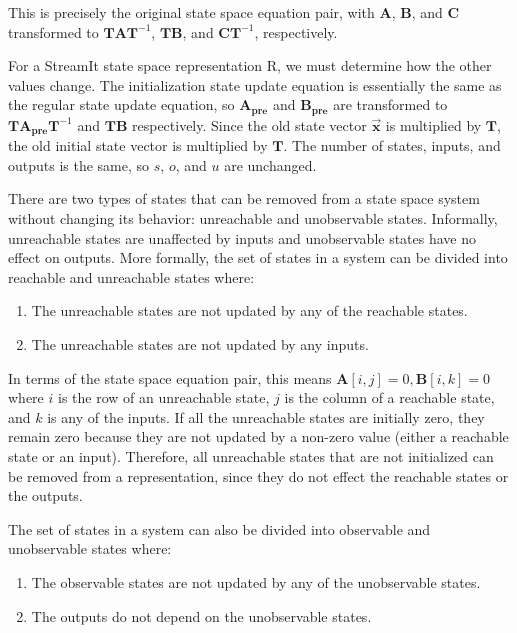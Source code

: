 \vspace{-9pt} This is precisely the original state space equation pair,
with $\mathbf{A}$, $\mathbf{B}$, and $\mathbf{C}$ transformed to
$\mathbf{T} \mathbf{A} \mathbf{T}^{-1}$, $\mathbf{T} \mathbf{B}$,
and $\mathbf{C} \mathbf{T}^{-1}$, respectively.

    For a StreamIt state space representation $\mathrm{R}$, we must
determine how the other values change. The initialization state
update equation is essentially the same as the regular state
update equation, so $\mathbf{A_{pre}}$ and $\mathbf{B_{pre}}$ are
transformed to $\mathbf{T} \mathbf{A_{pre}} \mathbf{T}^{-1}$ and
$\mathbf{T} \mathbf{B}$ respectively. Since the old state vector
$\vec{\mathbf{x}}$ is multiplied by $\mathbf{T}$, the old initial
state vector is multiplied by $\mathbf{T}$. The number of states,
inputs, and outputs is the same, so $s$, $o$, and $u$ are
unchanged.

\label{sec:state-removal}

    There are two types of states that can be removed from a
state space system without changing its behavior: unreachable and
unobservable states. Informally, unreachable states are unaffected by
inputs and unobservable states have no effect on outputs. More
formally, the set of states in a system can be divided into reachable
and unreachable states where:
\begin{enumerate}
\vspace{\itemshrink} \item The unreachable states are not updated by any of the
reachable states.

\vspace{\itemshrink} \item The unreachable states are not updated by any inputs.
\vspace{\itemshrink} \end{enumerate}

    In terms of the state space equation pair, this means $\mathbf{A}[i,j] =
0, \mathbf{B}[i,k] = 0$ where $i$ is the row of an unreachable
state, $j$ is the column of a reachable state, and $k$ is any of
the inputs.
    If all the unreachable states are initially zero, they
remain zero because they are not updated by a non-zero value
(either a reachable state or an input). Therefore, all unreachable
states that are not initialized can be removed from a
representation, since they do not effect the reachable states or
the outputs.

    The set of states in a system can also be divided into
observable and unobservable states where:
\begin{enumerate}
\vspace{\itemshrink} \item The observable states are not updated by any of the
unobservable states.

\vspace{\itemshrink} \item The outputs do not depend on the unobservable states.
\vspace{\itemshrink} \end{enumerate}

